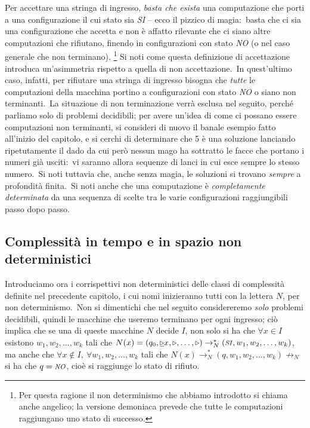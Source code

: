 \noindent Per accettare una stringa di ingresso, \textit{basta che esista} una computazione che porti a una configurazione il cui stato sia \textit{\footnotesize SI} -- ecco il pizzico di magia:\ basta che ci sia una configurazione che accetta e non è affatto rilevante che ci siano altre computazioni che rifiutano, finendo in configurazioni con stato \textit{\footnotesize NO} (o nel caso generale che non terminano).
\footnote{Per questa ragione il non determinismo che abbiamo introdotto si chiama anche angelico; la versione demoniaca prevede che tutte le computazioni raggiungano uno stato di successo.}
Si noti come questa definizione di accettazione introduca un'asimmetria rispetto a quella di non accettazione.\
In quest'ultimo caso, infatti, per rifiutare una stringa di ingresso bisogna che \textit{tutte} le computazioni della macchina portino a configurazioni con stato \textit{\footnotesize NO} o siano non terminanti.\
La situazione di non terminazione verrà esclusa nel seguito, perché parliamo solo di problemi decidibili; per avere un'idea di come ci possano essere computazioni non terminanti, si consideri di nuovo il banale esempio fatto all'inizio del capitolo, e si cerchi di determinare che 5 è una soluzione lanciando ripetutamente il dado da cui però nessun mago ha sottratto le facce che portano i numeri già usciti:\ vi saranno allora sequenze di lanci in cui esce sempre lo stesso numero.\
Si noti tuttavia che, anche senza magia, le soluzioni si trovano \textit{sempre} a profondità finita.\
Si noti anche che una computazione è \textit{completamente determinata} da una sequenza di scelte tra le varie configurazioni raggiungibili passo dopo passo.

\subsection{Complessità in tempo e in spazio non deterministici}

Introduciamo ora i corrispettivi non deterministici delle classi di complessità definite nel precedente capitolo, i cui nomi inizieranno tutti con la lettera $N$, per non determinismo.\
Non si dimentichi che nel seguito considereremo \textit{solo} problemi decidibili, quindi le macchine che useremo terminano per ogni ingresso; ciò implica che se una di queste macchine $N$ decide $I$, non solo si ha che $\forall x \in I$ esistono $w_1, w_2, \dots, w_k$ tali che $N(x) = (q_0, \underline{\triangleright}x, \triangleright, \dots,\triangleright) \rightarrow_N^*(\mbox{\textit{\footnotesize SI}}, w_1, w_2, \dots, w_k)$, ma anche che $\forall x \notin I,\ \forall w_1, w_2, \dots, w_k$ tali che $N(x) \rightarrow_N^* (q, w_1, w_2, \dots, w_k) \not\rightarrow_N$ si ha che $q = \mbox{\textit{\footnotesize NO}}$, cioè si raggiunge lo stato di rifiuto.\

